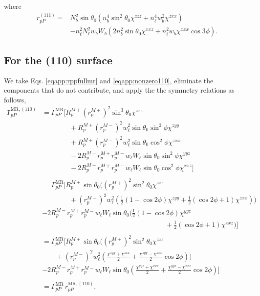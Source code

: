 where
\begin{equation}\label{eqapp:final-rpp.111}
\begin{split}
r^{(111)}_{pP} = 
&N^{2}_{b}\sin\theta_{0}(n^{4}_{b}\sin^{2}\theta_{0}\chi^{zzz} 
+ n^{4}_{\ell}w^{2}_{b}\chi^{zxx})\\
&- n^{2}_{\ell}N^{2}_{\ell}w_{b}W_{b}(2n^{2}_{b}\sin\theta_{0}\chi^{xxz}
 + n^{2}_{\ell}w_{b}\chi^{xxx}\cos3\phi).
\end{split}
\end{equation}


\subsection{For the (110) surface}

We take Eqs. \eqref{eqapp:rppfullmr} and \eqref{eqapp:nonzero110}, eliminate the
components that do not contribute, and apply the the symmetry relations as
follows,
\begin{equation*}
\begin{split}
\Upsilon^{\mathrm{MR},(110)}_{pP} &=
\Gamma^{\mathrm{MR}}_{pP}
\bigg[
R^{M+}_{p}\left(r^{M+}_{p}\right)^{2}\sin^{3}\theta_{0}\chi^{zzz}\\
&\qquad\qquad+ R^{M+}_{p}\left(r^{M-}_{p}\right)^{2}w^{2}_{\ell}
      \sin\theta_{0}\sin^{2}\phi\chi^{zyy}\\
&\qquad\qquad+ R^{M+}_{p}\left(r^{M-}_{p}\right)^{2}w^{2}_{\ell}
      \sin\theta_{0}\cos^{2}\phi\chi^{zxx}\\
&\qquad\qquad- 2R^{M-}_{p}r^{M+}_{p}r^{M-}_{p}w_{\ell}W_{\ell}
      \sin\theta_{0}\sin^{2}\phi\chi^{yyz}\\
&\qquad\qquad- 2R^{M-}_{p}r^{M+}_{p}r^{M-}_{p}w_{\ell}W_{\ell}
      \sin\theta_{0}\cos^{2}\phi\chi^{xxz}
\bigg]\\\\
&=
\Gamma^{\mathrm{MR}}_{pP}
\bigg[
R^{M+}_{p}\sin\theta_{0}
\bigg(
\left(r^{M+}_{p}\right)^{2}\sin^{2}\theta_{0}\chi^{zzz}\\
&\qquad\qquad+ \left(r^{M-}_{p}\right)^{2}w^{2}_{\ell}
\left(
\frac{1}{2}(1-\cos2\phi)\chi^{zyy} + \frac{1}{2}(\cos2\phi+1)\chi^{zxx}
\right)
\bigg)\\
&- 2R^{M-}_{p}r^{M+}_{p}r^{M-}_{p}w_{\ell}W_{\ell}\sin\theta_{0}
\bigg(
\frac{1}{2}(1-\cos2\phi)\chi^{yyz}\\
&\qquad\qquad\qquad\qquad\qquad\qquad\qquad\qquad\qquad
+ \frac{1}{2}(\cos2\phi+1)\chi^{xxz}
\bigg)
\bigg]\\\\
&=
\Gamma^{\mathrm{MR}}_{pP}
\bigg[
R^{M+}_{p}\sin\theta_{0}
\bigg(
\left(r^{M+}_{p}\right)^{2}\sin^{2}\theta_{0}\chi^{zzz}\\
&\qquad+ \left(r^{M-}_{p}\right)^{2}w^{2}_{\ell}
\left(
\frac{\chi^{zyy} + \chi^{zxx}}{2} + \frac{\chi^{zyy} - \chi^{zxx}}{2}\cos2\phi
\right)
\bigg)\\
&- 2R^{M-}_{p}r^{M+}_{p}r^{M-}_{p}w_{\ell}W_{\ell}\sin\theta_{0}
\left(
\frac{\chi^{yyz} + \chi^{xxz}}{2} + \frac{\chi^{yyz} - \chi^{xxz}}{2}\cos2\phi
\right)
\bigg]\\\\
&= \Gamma^{\mathrm{MR}}_{pP}\,r^{\mathrm{MR},(110)}_{pP},
\end{split}
\end{equation*}
